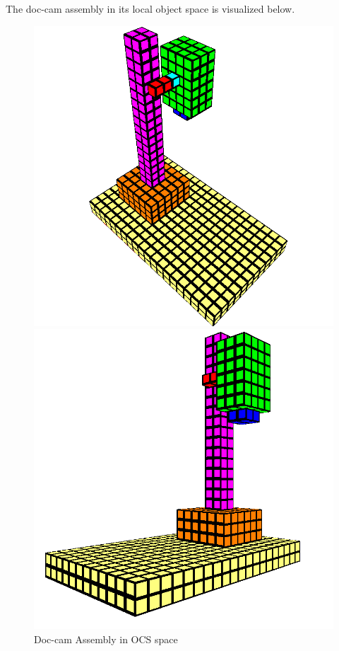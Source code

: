 \documentclass[12pt]{article}
\newcommand{\imgtext}[1]{
    The #1 assembly in its local object space is visualized below.
}
\begin{document}
        \imgtext{doc-cam}
        \begin{figure}[H]
            \begin{minipage}[b]{0.5\linewidth}
                \centering
                \includegraphics[width=\linewidth]{../images/doccam_1.png}
            \end{minipage}%
            \begin{minipage}[b]{0.5\linewidth}
                \centering
                \includegraphics[width=\linewidth]{../images/doccam_2.png}
            \end{minipage}%
            \caption{Doc-cam Assembly in OCS space}
        \end{figure}
\end{document}
